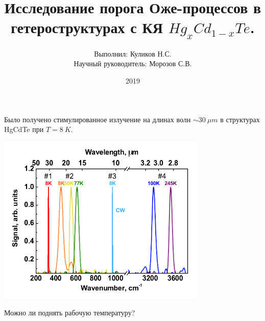 \documentclass[9pt,pdf]{beamer}
\title{Исследование порога Оже-процессов в гетероструктурах с КЯ $Hg_x Cd_{1-x} Te$.}
\author{Выполнил: Куликов Н.С.\\
        Научный руководитель: Морозов С.В.}
\institute{ИФМ РАН}
\date{2019}
\begin{document}
  \frame{\titlepage}

  \begin{frame}
    Было получено стимулированное излучение на длинах 
    волн $\sim 30~\mu m$ в структурах HgCdTe при $T=8~K$.

    \begin{center}
      \includegraphics[width=0.75\textwidth]{images/spectre_30mum.png}
    \end{center}

    Можно ли поднять рабочую температуру?
  \end{frame}
\end{document}
